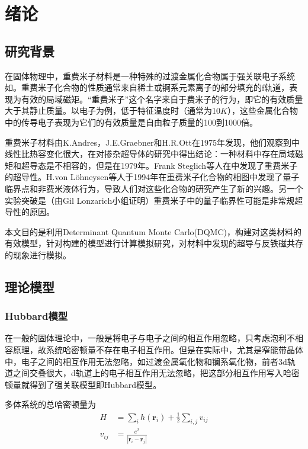 \section{绪论}
\subsection{研究背景}
在固体物理中，重费米子材料是一种特殊的过渡金属化合物属于强关联电子系统如。重费米子化合物的性质通常来自稀土或锕系元素离子的部分填充的f轨道，表现为有效的局域磁矩。“重费米子”这个名字来自于费米子的行为，即它的有效质量大于其静止质量。以电子为例，低于特征温度时（通常为10$K$），这些金属化合物中的传导电子表现为它们的有效质量是自由粒子质量的100到1000倍。

重费米子材料由K.Andres，J.E.Graebner和H.R.Ott在1975年发现，他们观察到中线性比热容变化很大，在对掺杂超导体的研究中得出结论：一种材料中存在局域磁矩和超导态是不相容的，但是在1979年。Frank Steglich等人在中发现了重费米子的超导性。H.von Löhneysen等人于1994年在重费米子化合物的相图中发现了量子临界点和非费米液体行为，导致人们对这些化合物的研究产生了新的兴趣。另一个实验突破是（由Gil Lonzarich小组证明）重费米子中的量子临界性可能是非常规超导性的原因。


本文目的是利用Determinant Quantum Monte Carlo(DQMC)，构建对这类材料的有效模型，针对构建的模型进行计算模拟研究，对材料中发现的超导与反铁磁共存的现象进行模拟。






\subsection{理论模型}

\subsubsection{Hubbard模型}
在一般的固体理论中，一般是将电子与电子之间的相互作用忽略，只考虑泡利不相容原理，故系统哈密顿量不存在电子相互作用。但是在实际中，尤其是窄能带晶体中，电子之间的相互作用无法忽略，如过渡金属氧化物和镧系氧化物，前者3d轨道之间交叠很大，d轨道上的电子相互作用无法忽略，把这部分相互作用写入哈密顿量就得到了强关联模型即Hubbard模型\cite{1}。

多体系统的总哈密顿量为
\begin{align*}
    H&=\sum_i h(\textbf{r}_i)+\frac{1}{2}\sum_{i,j}v_{ij}\\
    v_{ij}&=\frac{e^2}{|\textbf{r}_i-\textbf{r}_j|}
\end{align*}


